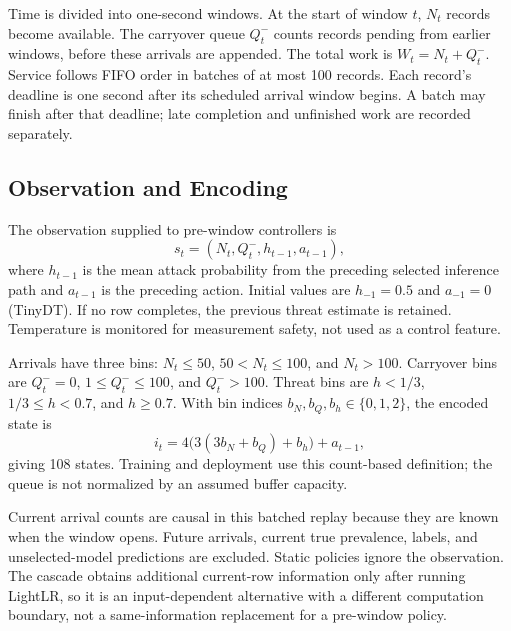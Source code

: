 \documentclass[journal]{IEEEtran}
\begin{document}
Time is divided into one-second windows. At the start of window $t$, $N_t$ records become available. The carryover queue $Q_t^-$ counts records pending from earlier windows, before these arrivals are appended. The total work is $W_t=N_t+Q_t^-$. Service follows FIFO order in batches of at most 100 records. Each record's deadline is one second after its scheduled arrival window begins. A batch may finish after that deadline; late completion and unfinished work are recorded separately.

\subsection{Observation and Encoding}
The observation supplied to pre-window controllers is
\begin{equation}\label{eq:observation}
s_t=(N_t,Q_t^-,h_{t-1},a_{t-1}),
\end{equation}
where $h_{t-1}$ is the mean attack probability from the preceding selected inference path and $a_{t-1}$ is the preceding action. Initial values are $h_{-1}=0.5$ and $a_{-1}=0$ (TinyDT). If no row completes, the previous threat estimate is retained. Temperature is monitored for measurement safety, not used as a control feature.

Arrivals have three bins: $N_t\leq50$, $50<N_t\leq100$, and $N_t>100$. Carryover bins are $Q_t^-=0$, $1\leq Q_t^-\leq100$, and $Q_t^->100$. Threat bins are $h<1/3$, $1/3\leq h<0.7$, and $h\geq0.7$. With bin indices $b_N,b_Q,b_h\in\{0,1,2\}$, the encoded state is
\begin{equation}\label{eq:index}
i_t=4\bigl(3(3b_N+b_Q)+b_h\bigr)+a_{t-1},
\end{equation}
giving 108 states. Training and deployment use this count-based definition; the queue is not normalized by an assumed buffer capacity.

Current arrival counts are causal in this batched replay because they are known when the window opens. Future arrivals, current true prevalence, labels, and unselected-model predictions are excluded. Static policies ignore the observation. The cascade obtains additional current-row information only after running LightLR, so it is an input-dependent alternative with a different computation boundary, not a same-information replacement for a pre-window policy.
\end{document}
